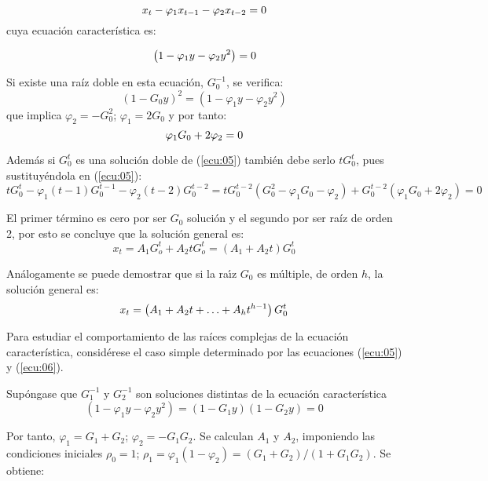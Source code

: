 \begin{equation}{
\label{ecu:05}
x_{t} -\varphi_{1} x_{t-1} -\varphi_{2} x_{t-2} =0}
\end{equation}
cuya ecuaci\'{o}n caracter\'{i}stica es:

\begin{equation}{
\label{ecu:06}
\left( {1-\varphi_{1} y-\varphi_{2} y^{2}} \right)=0}
\end{equation}

Si existe una ra\'{i}z doble en esta ecuaci\'{o}n, $G_{0}^{-1}$, se verifica:
\[
\left( {1-G_{0} y} \right)^{2}=\left( {1-\varphi_{1} y-\varphi_{2} y^{2}} \right)
\]
que implica $\varphi_{2} =-G_{0}^{2}$; $\varphi_{1} =2G_{0}$ y por tanto:
\begin{equation}{
\label{ecu:07}
\varphi_{1} G_{0} +2\varphi_{2} =0}
\end{equation}

Adem\'{a}s si $G_{0}^{t} $ es una soluci\'{o}n doble de (\ref{ecu:05}) tambi\'{e}n debe serlo $tG_{0}^{t}$, pues sustituy\'{e}ndola en (\ref{ecu:05}):
\[
tG_{0}^{t} -\varphi_{1} (t-1)G_{0}^{t-1} -\varphi_{2} \left(t-2 \right)G_{0}^{t-2} =tG_{0}^{t-2} \left(G_{0}^{2} -\varphi_{1} G_{0} -\varphi_{2} \right)+G_{0}^{t-2} \left(\varphi_{1} G_{0} +2\varphi_{2} \right)=0
\]

El primer t\'{e}rmino es cero por ser $G_{0}$ soluci\'{o}n y el segundo por ser ra\'{i}z de orden 2, por esto se concluye que la soluci\'{o}n general es:
\[
x_{t} =A_{1} G_{o}^{t} +A_{2} tG_{o}^{t} =\left(A_{1} +A_{2} t \right)G_{0}^{t} 
\]

An\'{a}logamente se puede demostrar que si la ra\'{\i}z $G_{0} $ es m\'{u}ltiple, de orden $h$, la soluci\'{o}n general es:
\begin{equation}{
\label{ecu:08}
x_{t} =\left(A_{1} +A_{2} t+\mathellipsis +A_{h} t^{h-1} \right)G_{0}^{t} }
\end{equation}

Para estudiar el comportamiento de las ra\'{i}ces complejas de la ecuaci\'{o}n caracter\'{i}stica, consid\'{e}rese el caso simple determinado por las ecuaciones (\ref{ecu:05}) y (\ref{ecu:06}).\newline

Sup\'{o}ngase que $G_{1}^{-1} $ y $G_{2}^{-1} $ son soluciones distintas de la ecuaci\'{o}n caracter\'{i}stica
\[
\left(1-\varphi_{1} y-\varphi_{2} y^{2} \right)=\left(1-G_{1} y \right)\left(1-G_{2} y \right)=0
\]

Por tanto, $\varphi_{1} =G_{1} +G_{2}$; $\varphi_{2} =-G_{1} G_{2}$. Se calculan $A_{1}$ y $A_{2}$, imponiendo las condiciones iniciales $\rho_{0} =1$; $\rho_{1} =\varphi_{1} \left( {1-\varphi_{2} } \right)=\left( {G_{1} +G_{2} } \right)/\left( {1+G_{1} G_{2} } \right)$. Se obtiene:

